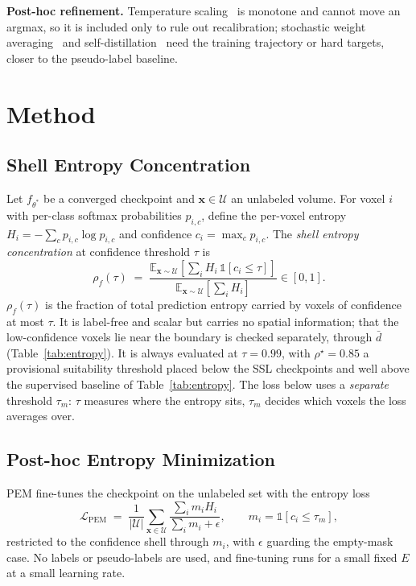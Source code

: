 \documentclass[conference]{IEEEtran}
\begin{document}
\noindent\textbf{Post-hoc refinement.}
Temperature scaling~\cite{guo2017calibration} is monotone and cannot move an argmax, so it is included only to rule out recalibration; stochastic weight averaging~\cite{izmailov2018swa} and self-distillation~\cite{hinton2015distillation} need the training trajectory or hard targets, closer to the pseudo-label baseline.

\section{Method}
\label{sec:method}
\subsection{Shell Entropy Concentration}
Let $f_{\theta^*}$ be a converged checkpoint and $\mathbf{x}\in\mathcal{U}$ an unlabeled volume. For voxel $i$ with per-class softmax probabilities $p_{i,c}$, define the per-voxel entropy $H_i=-\sum_c p_{i,c}\log p_{i,c}$ and confidence $c_i=\max_c p_{i,c}$. The \textit{shell entropy concentration} at confidence threshold $\tau$ is
\begin{equation}
\rho_f(\tau) \;=\; \frac{\mathbb{E}_{\mathbf{x}\sim\mathcal{U}}\!\left[\sum_{i} H_i\,\mathbb{1}[c_i\le\tau]\right]}{\mathbb{E}_{\mathbf{x}\sim\mathcal{U}}\!\left[\sum_{i} H_i\right]} \in [0,1].
\label{eq:rho}
\end{equation}
$\rho_f(\tau)$ is the fraction of total prediction entropy carried by voxels of confidence at most $\tau$. It is label-free and scalar but carries no spatial information; that the low-confidence voxels lie near the boundary is checked separately, through $\bar d$ (Table~\ref{tab:entropy}). It is always evaluated at $\tau=0.99$, with $\rho^\star=0.85$ a provisional suitability threshold placed below the SSL checkpoints and well above the supervised baseline of Table~\ref{tab:entropy}. The loss below uses a \emph{separate} threshold $\tau_m$: $\tau$ measures where the entropy sits, $\tau_m$ decides which voxels the loss averages over.

\subsection{Post-hoc Entropy Minimization}
PEM fine-tunes the checkpoint on the unlabeled set with the entropy loss
\begin{equation}
\mathcal{L}_{\text{PEM}} \;=\; \frac{1}{|\mathcal{U}|}\sum_{\mathbf{x}\in\mathcal{U}}\frac{\sum_{i} m_i H_i}{\sum_i m_i+\epsilon},
\qquad m_i=\mathbb{1}[c_i\le\tau_m],
\label{eq:pem}
\end{equation}
restricted to the confidence shell through $m_i$, with $\epsilon$ guarding the empty-mask case. No labels or pseudo-labels are used, and fine-tuning runs for a small fixed $E$ at a small learning rate.
\end{document}

